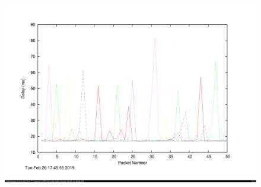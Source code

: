 \documentclass[a4paper,11pt]{article}
\begin{document}
		\begin{figure}[!htb]
			\centering
		    \begin{minipage}{\textwidth}
		        \centering
		        \includegraphics[width=\linewidth, height=0.43\textheight]{uqdelay.png}
		    \end{minipage}%
		\end{figure}
\end{document}
